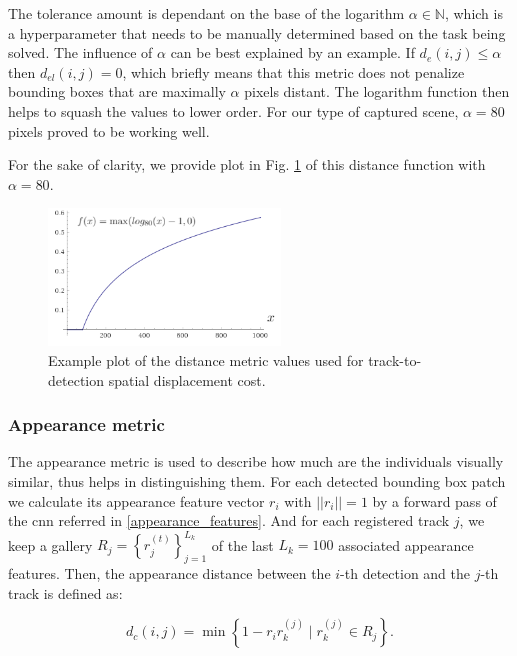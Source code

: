             The tolerance amount is dependant on the base of the logarithm $\alpha \in \mathbb{N}$, which is a hyperparameter that needs to be manually determined based on the task being solved. The influence of $\alpha$ can be best explained by an example. If $d_e(i,j) \leq \alpha$ then $d_{el}(i,j) = 0$, which briefly means that this metric does not penalize bounding boxes that are maximally $\alpha$ pixels distant. 
            The logarithm function then helps to squash the values to lower order. For our type of captured scene, $\alpha = 80$ pixels proved to be working well. 
            
            For the sake of clarity, we provide plot in Fig. \ref{fig:state_formula_plot} of this distance function with $\alpha = 80$.
            
            \begin{figure}[ht]
                \centering
                \includegraphics[width=0.55\textwidth]{resources/state_formula_plot.png}
                \caption{Example plot of the distance metric values used for track-to-detection spatial displacement cost.}
                \label{fig:state_formula_plot}
            \end{figure}
            
        \subsubsection{Appearance metric}
            The appearance metric is used to describe how much are the individuals visually similar, thus helps in distinguishing them. For each detected bounding box patch we calculate its appearance feature vector $r_i$ with $||r_i|| = 1$ by a forward pass of the \gls{cnn} referred in \ref{appearance_features}. And for each registered track $j$, we keep a gallery $R_j = \left\{ r_j^{(t)}\right\}_{j=1}^{L_k} $ of the last $L_k = 100$ associated appearance features. Then, the appearance distance between the $i$-th detection and the $j$-th track is defined as:
            
            \begin{equation}
                d_{c}(i,j) = \min \left\{ 1 - r_i r_k^{(j)} \mid  r_k^{(j)} \in R_j \right\}.
            \end{equation}
            
